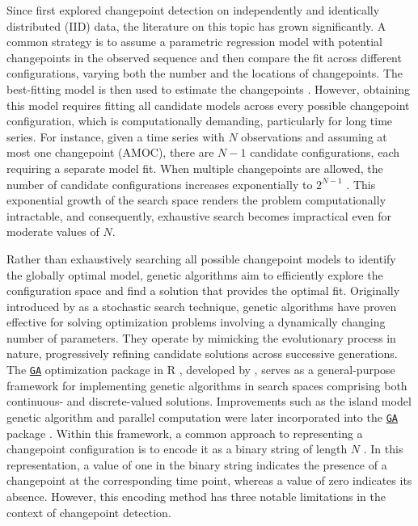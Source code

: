 Since \citet{page1955test} first explored changepoint detection on independently and identically distributed (IID) data, the literature on this topic has grown significantly. A common strategy is to assume a parametric regression model with potential changepoints in the observed sequence and then compare the fit across different configurations, varying both the number and the locations of changepoints. The best-fitting model is then used to estimate the changepoints \citep{aue2013structural, shi2022changepoint}. However, obtaining this model requires fitting all candidate models across every possible changepoint configuration, which is computationally demanding, particularly for long time series. For instance, given a time series with \(N\) observations and assuming at most one changepoint (AMOC), there are \(N-1\) candidate configurations, each requiring a separate model fit. When multiple changepoints are allowed, the number of candidate configurations increases exponentially to \(2^{N-1}\) \citep{lee2020trend}. This exponential growth of the search space renders the problem computationally intractable, and consequently, exhaustive search becomes impractical even for moderate values of \(N\).

Rather than exhaustively searching all possible changepoint models to identify the globally optimal model, genetic algorithms aim to efficiently explore the configuration space and find a solution that provides the optimal fit. Originally introduced by \citet{holland1975adaptation} as a stochastic search technique, genetic algorithms have proven effective for solving optimization problems involving a dynamically changing number of parameters. They operate by mimicking the evolutionary process in nature, progressively refining candidate solutions across successive generations. The \href{https://CRAN.R-project.org/package=GA}{\texttt{GA}} optimization package in R \citep{R}, developed by \citet{scrucca2013ga}, serves as a general-purpose framework for implementing genetic algorithms in search spaces comprising both continuous- and discrete-valued solutions. Improvements such as the island model genetic algorithm and parallel computation were later incorporated into the \href{https://CRAN.R-project.org/package=GA}{\texttt{GA}} package \citep{scrucca2017ga}. Within this framework, a common approach to representing a changepoint configuration is to encode it as a binary string of length \(N\) \citep{shi2022changepoint}. In this representation, a value of one in the binary string indicates the presence of a changepoint at the corresponding time point, whereas a value of zero indicates its absence. However, this encoding method has three notable limitations in the context of changepoint detection.

